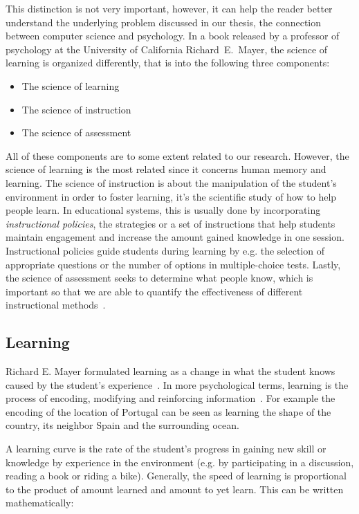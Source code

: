This distinction is not very important, however, it can help the reader better understand the underlying problem discussed in our thesis, the connection between computer science and psychology. In a book released by a professor of psychology at the University of California Richard~E.~Mayer, the science of learning is organized differently, that is into the following three components:

\begin{itemize}
  \item The science of learning
  \item The science of instruction
  \item The science of assessment
\end{itemize}

All of these components are to some extent related to our research. However, the science of learning is the most related since it concerns human memory and learning. The science of instruction is about the manipulation of the student's environment in order to foster learning, it's the scientific study of how to help people learn. In educational systems, this is usually done by incorporating \textit{instructional policies}, the strategies or a set of instructions that help students maintain engagement and increase the amount gained knowledge in one session. Instructional policies guide students during learning by e.g. the selection of appropriate questions or the number of options in multiple-choice tests. Lastly, the science of assessment seeks to determine what people know, which is important so that we are able to quantify the effectiveness of different instructional methods~\cite{RichardE.Mayer2010}.

\subsection{Learning}
\label{learning}

Richard E. Mayer formulated learning as a change in what the student knows caused by the student's experience~\cite{RichardE.Mayer2010}. In more psychological terms, learning is the process of encoding, modifying and reinforcing information~\cite{Lewis}. For example the encoding of the location of Portugal can be seen as learning the shape of the country, its neighbor Spain and the surrounding ocean.

A learning curve is the rate of the student's progress in gaining new skill or knowledge by experience in the environment (e.g. by participating in a discussion, reading a book or riding a bike). Generally, the speed of learning is proportional to the product of amount learned and amount to yet learn. This can be written mathematically:

